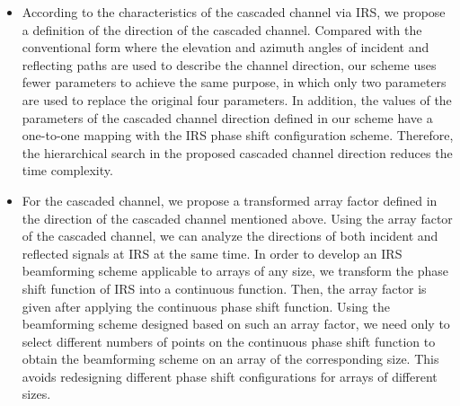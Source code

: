 \documentclass[12pt,draftclsnofoot,onecolumn]{IEEEtran}
\begin{document}
	
	\begin{itemize}
		\item  According to the characteristics of the cascaded channel via  IRS, we propose a definition of the direction of the cascaded channel. Compared with the conventional form where the elevation and azimuth angles of incident and reflecting paths are used to describe the channel direction, our scheme uses fewer parameters to achieve the same purpose, in which only two parameters are used to replace the original four parameters. In addition, the values of the parameters of the cascaded channel direction defined  in our scheme have a one-to-one mapping with the IRS phase shift configuration scheme. Therefore, the hierarchical search in the proposed cascaded channel direction reduces the time complexity.
		\item For the cascaded channel, we propose a transformed array factor  defined in the direction of the cascaded channel  mentioned above. Using the array factor of the cascaded channel, we can analyze the directions of both incident and reflected signals at IRS at the same time. In order to develop an IRS beamforming scheme  applicable to arrays of any size, we transform the phase shift function of IRS into a continuous function. Then, the array factor is given after applying the continuous phase shift function. Using the beamforming scheme designed based on such an array factor, we need only to select different numbers of points on the continuous phase shift function to obtain the beamforming scheme on an array of the corresponding size. This avoids redesigning different phase shift configurations for arrays of different sizes. 

\end{itemize}
\end{document}
